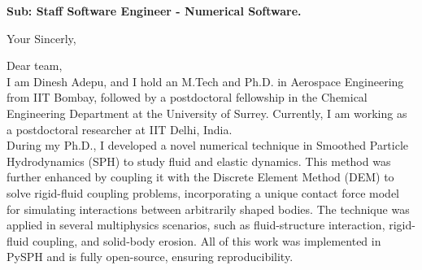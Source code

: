\documentclass[11pt,a4paper,roman]{moderncv}
\begin{document}
\date{\today}
\opening{\textbf{Sub: Staff Software Engineer - Numerical Software.}}
\closing{Your Sincerly, \vspace{-1em}}


\makelettertitle



Dear team,
\\
\vspace{1em}
I am Dinesh Adepu, and I hold an M.Tech and Ph.D. in Aerospace
Engineering from IIT Bombay, followed by a postdoctoral fellowship in
the Chemical Engineering Department at the University of
Surrey. Currently, I am working as a postdoctoral researcher at IIT
Delhi, India. \\


\vspace{1em}
During my Ph.D., I developed a novel numerical technique in Smoothed
Particle Hydrodynamics (SPH) to study fluid and elastic dynamics. This
method was further enhanced by coupling it with the Discrete Element
Method (DEM) to solve rigid-fluid coupling problems, incorporating a
unique contact force model for simulating interactions between
arbitrarily shaped bodies. The technique was applied in several
multiphysics scenarios, such as fluid-structure interaction,
rigid-fluid coupling, and solid-body erosion. All of this work was
implemented in PySPH and is fully open-source, ensuring
reproducibility.\\
\end{document}

